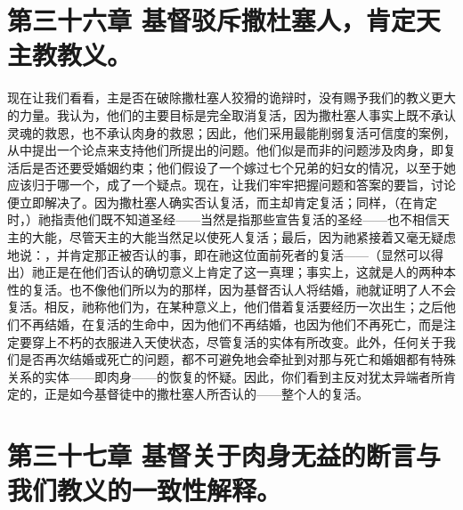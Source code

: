 
\section{第三十六章 基督驳斥撒杜塞人，肯定天主教教义。}

现在让我们看看，主是否在破除撒杜塞人狡猾的诡辩时，没有赐予我们的教义更大的力量。我认为，他们的主要目标是完全取消复活，因为撒杜塞人事实上既不承认灵魂的救恩，也不承认肉身的救恩；因此，他们采用最能削弱复活可信度的案例，从中提出一个论点来支持他们所提出的问题。他们似是而非的问题涉及肉身，即复活后是否还要受婚姻约束；他们假设了一个嫁过七个兄弟的妇女的情况，以至于她应该归于哪一个，成了一个疑点。现在，让我们牢牢把握问题和答案的要旨，讨论便立即解决了。因为撒杜塞人确实否认复活，而主却肯定复活；同样，（在肯定时，）祂指责他们既不知道圣经——当然是指那些宣告复活的圣经——也不相信天主的大能，尽管天主的大能当然足以使死人复活；最后，因为祂紧接着又毫无疑虑地说：，并肯定那正被否认的事，即在祂这位面前死者的复活——（显然可以得出）祂正是在他们否认的确切意义上肯定了这一真理；事实上，这就是人的两种本性的复活。也不像他们所以为的那样，因为基督否认人将结婚，祂就证明了人不会复活。相反，祂称他们为，在某种意义上，他们借着复活要经历一次出生；之后他们不再结婚，在复活的生命中，因为他们不再结婚，也因为他们不再死亡，而是注定要穿上不朽的衣服进入天使状态，尽管复活的实体有所改变。此外，任何关于我们是否再次结婚或死亡的问题，都不可避免地会牵扯到对那与死亡和婚姻都有特殊关系的实体——即肉身——的恢复的怀疑。因此，你们看到主反对犹太异端者所肯定的，正是如今基督徒中的撒杜塞人所否认的——整个人的复活。\par


\section{第三十七章 基督关于肉身无益的断言与我们教义的一致性解释。}

